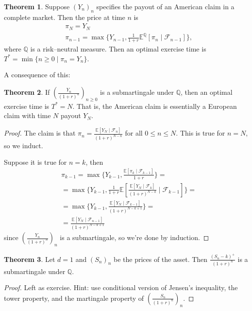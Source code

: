 \documentclass{article}
\theoremstyle{definition}
\newtheorem{theorem}{Theorem}[section]
\begin{document}
\begin{theorem}
    Suppose $(Y_n)_n$ specifies the payout of an American claim in a complete market. Then the price at time $n$ is 
    \begin{align*}
        &\pi_N=Y_N \\
        &\pi_{n-1}=\max \{Y_{n-1},\frac{1}{1+r}\mathbb{E}^\mathbb{Q}[\pi_n \mid \mathcal{F}_{n-1}]\},
    \end{align*}
    where $\mathbb{Q}$ is a risk--neutral measure. Then an optimal exercise time is $T^* = \min \{n\ge 0 \mid \pi_n = Y_n\}$.
\end{theorem}
A consequence of this:
\begin{theorem}
    If $\left(\frac{Y_n}{(1+r)^n}\right)_{n\ge 0}$ is a submartingale under $\mathbb{Q}$, then an optimal exercise time is $T^*=N$. That is, the American claim is essentially a European claim with time $N$ payout $Y_N$.
\end{theorem}
\begin{proof}
    The claim is that $\pi_n = \frac{\mathbb{E}[Y_N \mid \mathcal{F}_n]}{(1+r)^{N-n}}$ for all $0\le n \le N$. This is true for $n=N$, so we induct.
    \vspace{1mm}
    
    Suppose it is true for $n=k$, then 
    \begin{align*}
        &\pi_{k-1} = \max \{Y_{k-1}, \frac{\mathbb{E}[\pi_k \mid \mathcal{F}_{k-1}]}{1+r}\} = \\
        &= \max \{Y_{k-1}, \frac{1}{1+r}\mathbb{E}[\frac{\mathbb{E}[Y_{N} \mid \mathcal{F}_k]}{(1+r)^{N-k}}\mid \mathcal{F}_{k-1}]\} = \\
        &= \max \{Y_{k-1}, \frac{\mathbb{E}[Y_N \mid \mathcal{F}_{k-1}]}{(1+r)^{N-k+1}}\} = \\
        &= \frac{\mathbb{E}[Y_N \mid \mathcal{F}_{n-1}]}{(1+r)^{N-k+1}}
    \end{align*}
    since $\left(\frac{Y_n}{(1+r)^{n}}\right)_n$ is a submartingale, so we're done by induction.
\end{proof}
\begin{theorem}
    Let $d=1$ and $(S_n)_n$ be the prices of the asset. Then $\frac{(S_n-k)^+}{(1+r)^n}$ is a submartingale under $\mathbb{Q}$.
\end{theorem}
\begin{proof}
    Left as exercise. Hint: use conditional version of Jensen's inequality, the tower property, and the martingale property of $\left(\frac{S_n}{(1+r)^n}\right)_n$.
\end{proof}
\end{document}
